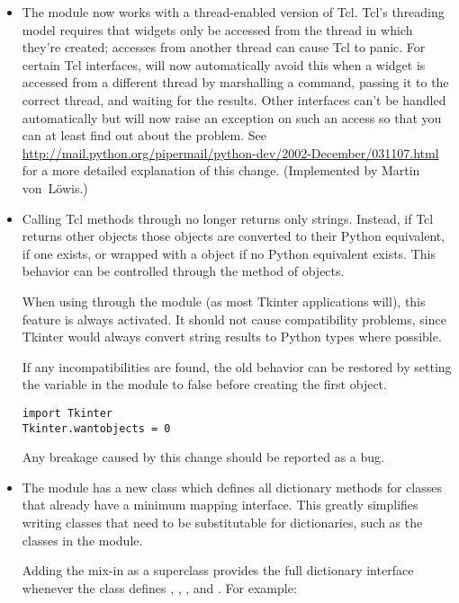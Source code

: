 \documentclass{howto}
\begin{document}
\begin{itemize}
\item The  module now works with a thread-enabled 
version of Tcl.  Tcl's threading model requires that widgets only be
accessed from the thread in which they're created; accesses from
another thread can cause Tcl to panic.  For certain Tcl interfaces,
 will now automatically avoid this 
when a widget is accessed from a different thread by marshalling a
command, passing it to the correct thread, and waiting for the
results.  Other interfaces can't be handled automatically but
 will now raise an exception on such an access so that
you can at least find out about the problem.  See
\url{http://mail.python.org/pipermail/python-dev/2002-December/031107.html} %
for a more detailed explanation of this change.  (Implemented by
Martin von~L\"owis.)

\item Calling Tcl methods through  no longer 
returns only strings. Instead, if Tcl returns other objects those
objects are converted to their Python equivalent, if one exists, or
wrapped with a  object if no Python equivalent
exists. This behavior can be controlled through the
 method of  objects.

When using  through the  module (as
most Tkinter applications will), this feature is always activated. It
should not cause compatibility problems, since Tkinter would always
convert string results to Python types where possible.

If any incompatibilities are found, the old behavior can be restored
by setting the  variable in the 
module to false before creating the first  object.

\begin{verbatim}
import Tkinter
Tkinter.wantobjects = 0
\end{verbatim}

Any breakage caused by this change should be reported as a bug.

\item The  module has a new  class which
defines all dictionary methods for classes that already have a minimum
mapping interface.  This greatly simplifies writing classes that need
to be substitutable for dictionaries, such as the classes in 
the  module.
 
Adding the mix-in as a superclass provides the full dictionary
interface whenever the class defines ,
, , and .
For example:
 

\end{itemize}
\end{document}
